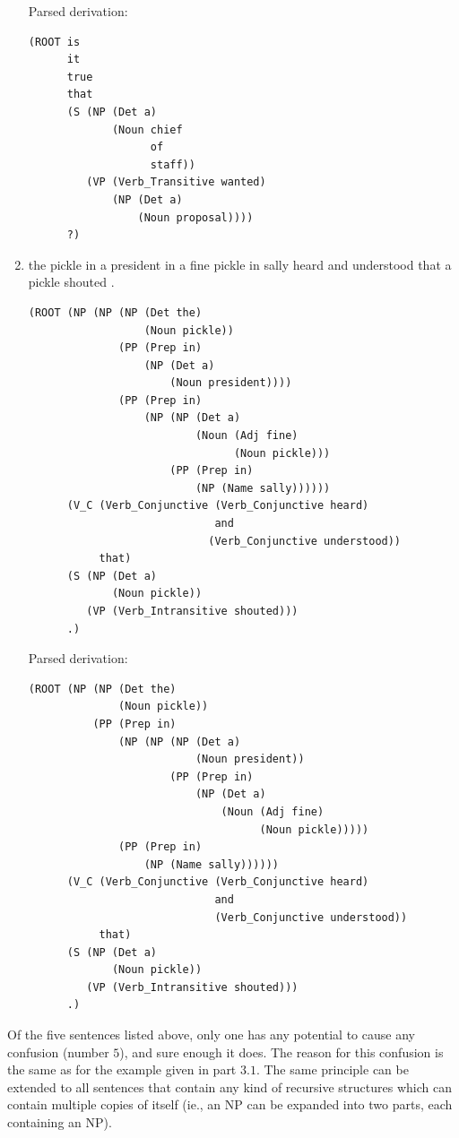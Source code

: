 \documentclass[11pt]{article}
\begin{document}
\begin{enumerate}[label=(\arabic*)]
            Parsed derivation:
            \begin{verbatim}
(ROOT is
      it
      true
      that
      (S (NP (Det a)
             (Noun chief
                   of
                   staff))
         (VP (Verb_Transitive wanted)
             (NP (Det a)
                 (Noun proposal))))
      ?)
      \end{verbatim}
      \item the pickle in a president in a fine pickle in sally heard and understood that a pickle shouted .

            \begin{verbatim}
(ROOT (NP (NP (NP (Det the)
                  (Noun pickle))
              (PP (Prep in)
                  (NP (Det a)
                      (Noun president))))
              (PP (Prep in)
                  (NP (NP (Det a)
                          (Noun (Adj fine)
                                (Noun pickle)))
                      (PP (Prep in)
                          (NP (Name sally))))))
      (V_C (Verb_Conjunctive (Verb_Conjunctive heard)
                             and
                            (Verb_Conjunctive understood))
           that)
      (S (NP (Det a)
             (Noun pickle))
         (VP (Verb_Intransitive shouted)))
      .)
      \end{verbatim}

            Parsed derivation:
            \begin{verbatim}
(ROOT (NP (NP (Det the)
              (Noun pickle))
          (PP (Prep in)
              (NP (NP (NP (Det a)
                          (Noun president))
                      (PP (Prep in)
                          (NP (Det a)
                              (Noun (Adj fine)
                                    (Noun pickle)))))
              (PP (Prep in)
                  (NP (Name sally))))))
      (V_C (Verb_Conjunctive (Verb_Conjunctive heard)
                             and
                             (Verb_Conjunctive understood))
           that)
      (S (NP (Det a)
             (Noun pickle))
         (VP (Verb_Intransitive shouted)))
      .)
      \end{verbatim}
\end{enumerate}

Of the five sentences listed above, only one has any potential to cause any confusion (number $5$), and sure enough it does. The reason for this confusion is the same as for the example given in part $3.1$. The same principle can be extended to all sentences that contain any kind of recursive structures which can contain multiple copies of itself (ie., an NP can be expanded into two parts, each containing an NP).
\end{document}
